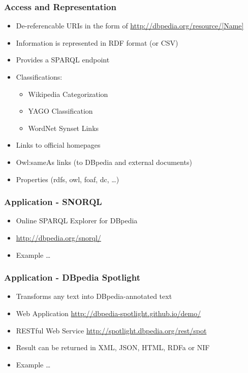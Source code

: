 \begin{frame}
\frametitle{Access and Representation}
\begin{itemize}
  \item De-referencable URIs in the form of
  \url{http://dbpedia.org/resource/[Name]}
  \item Information is represented in RDF format (or CSV)
  \item Provides a SPARQL endpoint
  \item Classifications:
  \begin{itemize}
    \item Wikipedia Categorization
    \item YAGO Classification
    \item WordNet Synset Links
  \end{itemize}
  \item Links to official homepages
  \item Owl:sameAs links (to DBpedia and external documents)
  \item Properties (rdfs, owl, foaf, dc, \ldots)
  
\end{itemize}
\end{frame}

\begin{frame}
\frametitle{Application - SNORQL}
\begin{itemize}
  \item Online SPARQL Explorer for DBpedia
  \item \url{http://dbpedia.org/snorql/}
  \item Example \ldots
\end{itemize}
\end{frame}


\begin{frame}
\frametitle{Application - DBpedia Spotlight}
\begin{itemize}
  \item Transforms any text into DBpedia-annotated text
  \item Web Application \url{http://dbpedia-spotlight.github.io/demo/}
  \item RESTful Web Service \url{http://spotlight.dbpedia.org/rest/spot}
  \item Result can be returned in XML, JSON, HTML, RDFa or NIF 
  \item Example \ldots
\end{itemize}
\end{frame}
